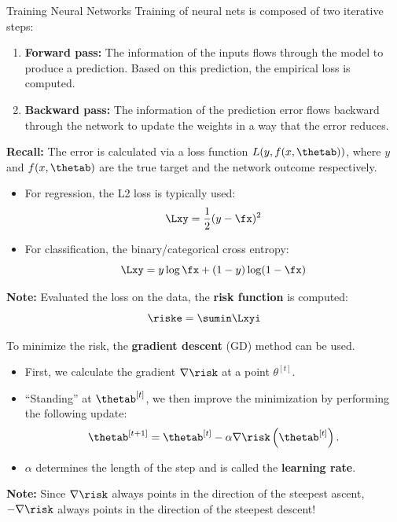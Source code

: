 







\begin{vbframe}{Training Neural Networks}
\lz
Training of neural nets is composed of two iterative steps:
\lz
\begin{enumerate}
\item \textbf{Forward pass:} The information of the inputs flows through the model to produce a prediction. Based on this prediction, the empirical loss is computed.
\lz
\item \textbf{Backward pass:} The information of the prediction error flows backward through the network to update the weights in a way that the error reduces.
\end{enumerate}
\lz

\textbf{Recall:} The error is calculated via a loss function $L(y, f(x, \thetab))$, where $y$ and $f(x, \thetab)$ are the true target and the network outcome respectively.
\framebreak

\lz
\lz
\begin{itemize}
\item For regression, the L2 loss is typically used:
$$\Lxy = \frac{1}{2}(y - \fx)^2$$
\item For classification, the binary/categorical cross entropy:
$$\Lxy = y \log \fx + (1 - y) \log(1 - \fx)$$
\end{itemize}
\lz
\lz
\textbf{Note:} Evaluated the loss on the data, the \textbf{risk function} is computed:
$$\riske = \sumin \Lxyi$$
\framebreak

\lz
To minimize the risk, the \textbf{gradient descent} (GD) method can be used.
\lz
\begin{itemize}
\item First, we calculate the gradient $\nabla \risk$ at a point $\theta^{[t]}$.
\lz
\item \enquote{Standing} at $\thetab^{[t]}$, we then improve the minimization by performing the following update:
$$\thetab^{[t + 1 ]}  = \thetab^{[t]} - \alpha \nabla \risk\left(\thetab^{[t]}\right).$$
\item $\alpha$ determines the length of the step and is called the \textbf{learning rate}.
\end{itemize}
\lz
\lz
\textbf{Note:} Since $\nabla \risk$ always points in the direction of the steepest ascent, $-\nabla \risk$ always points in the direction of the steepest descent!
\end{vbframe}

